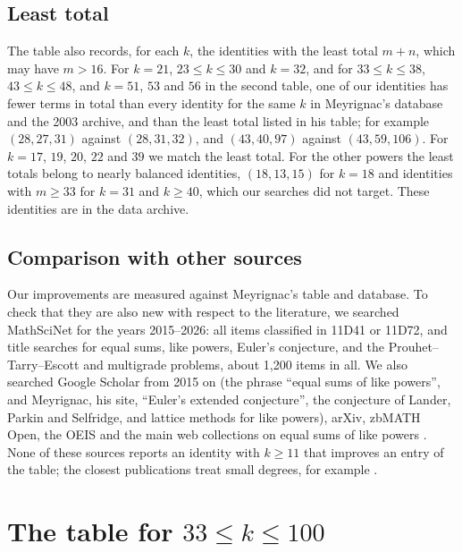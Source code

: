 \documentclass[11pt]{amsart}
\theoremstyle{definition}
\theoremstyle{remark}
\begin{document}
\subsection{Least total}\label{sec:leasttotal}
The table also records, for each $k$, the identities with the least total $m+n$, which may have
$m>16$. For $k=21$, $23\le k\le30$ and $k=32$, and for $33\le k\le38$, $43\le k\le48$, and
$k=51$, $53$ and $56$ in the second table, one of our identities has fewer terms in total than every identity
for the same $k$ in Meyrignac's database and the 2003 archive, and than the least total listed
in his table; for example $(28,27,31)$ against
$(28,31,32)$, and $(43,40,97)$ against $(43,59,106)$. For $k=17$, $19$, $20$, $22$ and $39$ we
match the least total. For the other powers the least totals belong to nearly balanced
identities, $(18,13,15)$ for $k=18$ and identities with $m\ge33$ for $k=31$ and $k\ge40$, which
our searches did not target. These identities are in the data
archive.

\subsection{Comparison with other sources}\label{sec:sources}
Our improvements are measured against Meyrignac's table and database. To check that they are
also new with respect to the literature, we searched MathSciNet for the years 2015--2026: all
items classified in 11D41 or 11D72, and title searches for equal sums, like powers, Euler's
conjecture, and the Prouhet--Tarry--Escott and multigrade problems, about 1,200 items in all.
We also searched Google Scholar from 2015 on (the phrase ``equal sums of like powers'', and
Meyrignac, his site, ``Euler's extended conjecture'', the conjecture of Lander, Parkin and
Selfridge, and lattice methods for like powers), arXiv, zbMATH Open, the OEIS and the main web
collections on equal sums of like powers
\cite{WroblewskiTables,PiezasCollection,ChenShuwenESLP,PerrenetPowersums}. None of these sources
reports an identity with $k\ge11$ that improves an entry of the table; the closest publications
treat small degrees, for example \cite{Choudhry2016,Wagstaff2022,Braun2026}.

\section{The table for \texorpdfstring{$33\le k\le100$}{33 <= k <= 100}}\label{sec:high}
\end{document}
